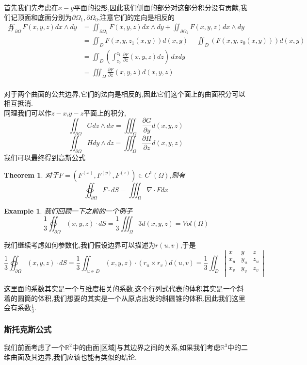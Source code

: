 \documentclass[11pt,hyperref,a4paper,UTF8]{ctexart}
\newtheorem{theorem}{Theorem}[subsection]
\newtheorem{example}{Example}[subsection]
\newcommand{\RR}{\mathbb{R}}
\newcommand{\parameter}[1]{\left(#1\right)}
\begin{document}
\begin{CJK}{UTF8}{gkai}
首先我们先考虑在$x-y$平面的投影,因此我们侧面的部分对这部分积分没有贡献,我们记顶面和底面分别为$\partial \Omega_1,\partial \Omega_0$,注意它们的定向是相反的
\[
\begin{aligned}  
  \oiint_{\partial \Omega} F(x,y,z) dx \wedge dy &= \iint_{\partial \Omega_1} F(x,y,z)dx\wedge dy +\iint_{\partial \Omega_2} F(x,y,z)dx\wedge dy\\
  &= \iint_D F(x,y,z_1(x,y)) d(x,y) - \iint_D (F(x,y,z_0(x,y)))d(x,y)\\
  &= \iint_D \parameter{\int_{z_0}^{z_1} \frac{\partial F}{\partial z}(x,y,z) dz}\, dx dy\\
  &= \iiint_{\Omega} \frac{\partial F}{\partial z}(x,y,z)d(x,y,z)\\
\end{aligned}  
\]

对于两个曲面的公共边界,它们的法向是相反的,因此它们这个面上的曲面积分可以相互抵消.\\

同理我们可以作$z-x$,$y-z$平面上的积分,
\[\iint_{\partial \Omega}G dz \wedge dx = \iiint_{\Omega} \frac{\partial G}{\partial y} d(x,y,z)\]
\[\iint_{\partial \Omega} H dy \wedge dz = \iiint_{\Omega} \frac{\partial H}{\partial z} d(x,y,z)\]
我们可以最终得到高斯公式
\begin{theorem}
  对于$F = (F^{(x)},F^{(y)},F^{(z)}) \in C^1(\Omega)$,则有
  \[\oiint_{\partial \Omega} F\cdot dS = \iiint_{\Omega} \nabla \cdot F dx\]
\end{theorem}

\begin{example}
  我们回顾一下之前的一个例子
  \[\frac{1}{3} \oiint_{\partial \Omega} (x,y,z) \cdot dS = \frac{1}{3} \iiint_{\Omega} 3 d(x,y,z) = Vol(\Omega)\]
\end{example}

我们继续考虑如何参数化,我们假设边界可以描述为$r(u,v)$,于是
\[\frac{1}{3} \oiint_{\partial \Omega} (x,y,z)\cdot dS = \frac{1}{3} \iint_{u \in D} (x,y,z) \cdot (r_u\times r_v)d(u,v) = \frac{1}{3} \iint_D\left|\begin{matrix}
  x & y & z\\
  x_u & y_u & z_u\\
  x_v & y_v & z_v\\
\end{matrix}\right|\]

这里面的系数其实是一个与维度相关的系数,这个行列式代表的体积其实是一个斜着的圆筒的体积,我们想要的其实是一个从原点出发的斜圆锥的体积,因此我们这里会有系数$\frac{1}{3}$.
\subsubsection{斯托克斯公式}
我们前面考虑了一个$\RR^2$中的曲面[区域]与其边界之间的关系,如果我们考虑$\RR^3$中的二维曲面及其边界,我们应该也能有类似的结论.


\end{CJK}
\end{document}
